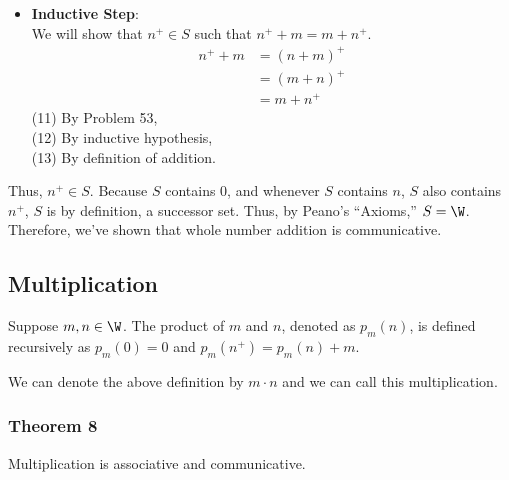 {\begin{itemize}
                    \item \textbf{Inductive Step}: \\
                    We will show that $n^+\in S$ such that $n^+ + m = m + n^+$. 
                    \begin{align}
                        n^+ + m &= (n + m)^+ \\
                        &= (m + n)^+ \\
                        &= m + n^+
                    \end{align}
                    (11) By Problem 53, \\
                    (12) By inductive hypothesis, \\
                    (13) By definition of addition.                    
                \end{itemize}
                 Thus, $n^+ \in S$. Because $S$ contains 0, and whenever $S$ contains $n$, $S$ also contains $n^+$, $S$ is by definition, a successor set. Thus, by Peano's ``Axioms,'' $S = \W$. Therefore, we've shown that whole number addition is communicative.
            }

    \subsection{Multiplication}

        \begin{definition}
            Suppose $m,n \in \W$. The product of $m$ and $n$, denoted as $p_m(n)$, is defined recursively as $p_m(0) = 0$ and $p_m(n^+) = p_m(n) + m$.
        \end{definition}
        
        \begin{notation}
            We can denote the above definition by $m\cdot n$ and we can call this multiplication.
        \end{notation}

        \subsubsection{Theorem 8}
        
            \begin{ntheorem}
                Multiplication is associative and communicative. 
            \end{ntheorem}


